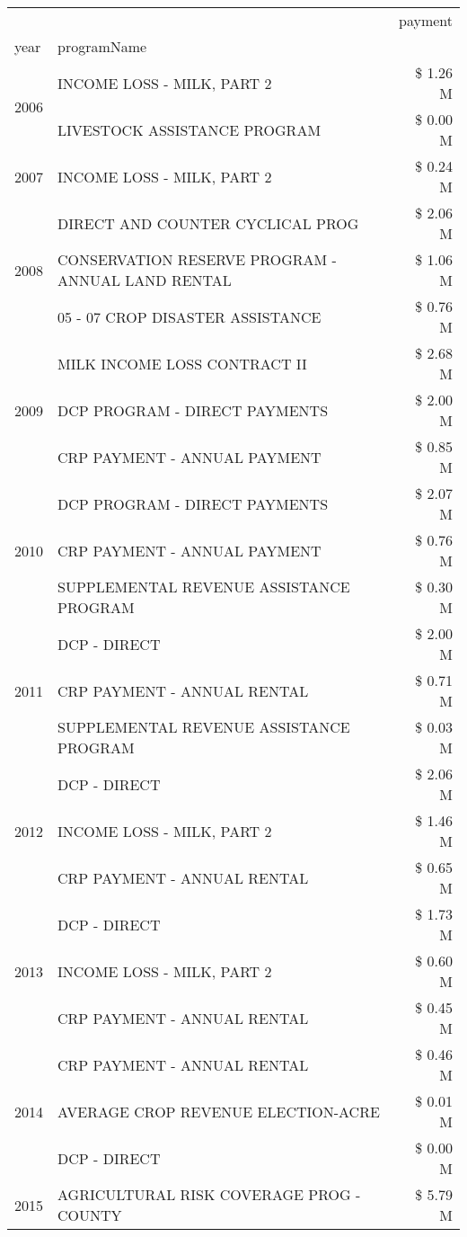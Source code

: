\begin{tabular}{llr}
\toprule
 &  & payment \\
year & programName &  \\
\midrule
\multirow[t]{2}{*}{2006} & INCOME LOSS - MILK, PART 2 & \$ 1.26 M \\
 & LIVESTOCK ASSISTANCE PROGRAM & \$ 0.00 M \\
\cline{1-3}
2007 & INCOME LOSS - MILK, PART 2 & \$ 0.24 M \\
\cline{1-3}
\multirow[t]{3}{*}{2008} & DIRECT AND COUNTER CYCLICAL PROG & \$ 2.06 M \\
 & CONSERVATION RESERVE PROGRAM - ANNUAL LAND RENTAL & \$ 1.06 M \\
 & 05 - 07 CROP DISASTER ASSISTANCE & \$ 0.76 M \\
\cline{1-3}
\multirow[t]{3}{*}{2009} & MILK INCOME LOSS CONTRACT II & \$ 2.68 M \\
 & DCP PROGRAM - DIRECT PAYMENTS & \$ 2.00 M \\
 & CRP PAYMENT - ANNUAL PAYMENT & \$ 0.85 M \\
\cline{1-3}
\multirow[t]{3}{*}{2010} & DCP PROGRAM - DIRECT PAYMENTS & \$ 2.07 M \\
 & CRP PAYMENT - ANNUAL PAYMENT & \$ 0.76 M \\
 & SUPPLEMENTAL REVENUE ASSISTANCE PROGRAM & \$ 0.30 M \\
\cline{1-3}
\multirow[t]{3}{*}{2011} & DCP - DIRECT & \$ 2.00 M \\
 & CRP PAYMENT - ANNUAL RENTAL & \$ 0.71 M \\
 & SUPPLEMENTAL REVENUE ASSISTANCE PROGRAM & \$ 0.03 M \\
\cline{1-3}
\multirow[t]{3}{*}{2012} & DCP - DIRECT & \$ 2.06 M \\
 & INCOME LOSS - MILK, PART 2 & \$ 1.46 M \\
 & CRP PAYMENT - ANNUAL RENTAL & \$ 0.65 M \\
\cline{1-3}
\multirow[t]{3}{*}{2013} & DCP - DIRECT & \$ 1.73 M \\
 & INCOME LOSS - MILK, PART 2 & \$ 0.60 M \\
 & CRP PAYMENT - ANNUAL RENTAL & \$ 0.45 M \\
\cline{1-3}
\multirow[t]{3}{*}{2014} & CRP PAYMENT - ANNUAL RENTAL & \$ 0.46 M \\
 & AVERAGE CROP REVENUE ELECTION-ACRE & \$ 0.01 M \\
 & DCP - DIRECT & \$ 0.00 M \\
\cline{1-3}
\multirow[t]{3}{*}{2015} & AGRICULTURAL RISK COVERAGE PROG - COUNTY & \$ 5.79 M \\

\end{tabular}
